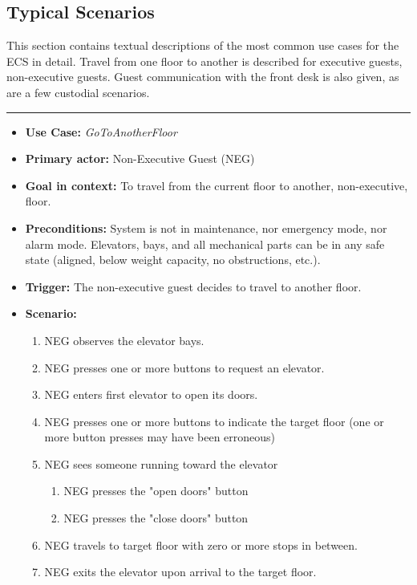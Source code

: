\documentclass[12pt]{article}
\begin{document}
	\subsection*{Typical Scenarios} This section contains textual descriptions of the most common use cases for the ECS in detail.
	Travel from one floor to another is described for executive guests, non-executive guests. Guest communication with the front desk
	is also given, as are a few custodial scenarios.
		\par\noindent\rule{\textwidth}{0.4pt}
		\begin{itemize} %
			\item[] \textbf{Use Case:} \textit{GoToAnotherFloor}
			\item[] \textbf{Primary actor:} Non-Executive Guest (NEG)
			\item[] \textbf{Goal in context:} To travel from the current floor to another, non-executive, floor.
			\item[] \textbf{Preconditions:} System is not in maintenance, nor emergency mode, nor alarm mode. 
			Elevators, bays, and all mechanical parts can be in any safe state (aligned, below weight capacity, 
			no obstructions, etc.).
			\item[] \textbf{Trigger:} The non-executive guest decides to travel to another floor.
			\item[] { \textbf{Scenario:}
		        \begin{enumerate}
		        	\item NEG observes the elevator bays.
		        	\item NEG presses one or more buttons to request an elevator.
		        	\item NEG enters first elevator to open its doors.
		        	\item NEG presses one or more buttons to indicate the target floor (one or more 
		        	button presses may have been erroneous)
		        	\item{NEG sees someone running toward the elevator
		        		\begin{enumerate}
		        			\item NEG presses the "open doors" button
		        			\item NEG presses the  "close doors" button
		        		\end{enumerate}}
		        	\item NEG travels to target floor with zero or more stops in between.
		        	\item NEG exits the elevator upon arrival to the target floor.

\end{enumerate}}
\end{itemize}
\end{document}
